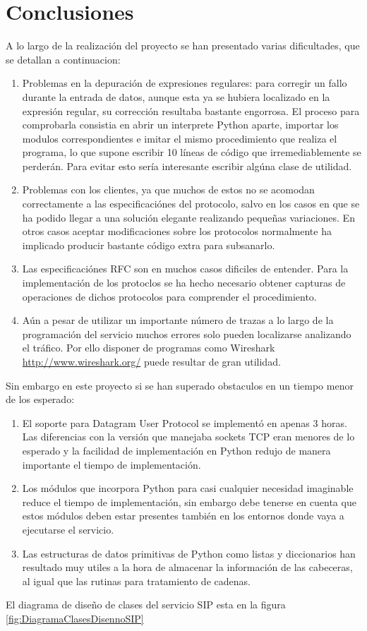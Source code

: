 \documentclass[a4paper,spanish,12pt]{book}
\begin{document}
\section{Conclusiones}
A lo largo de la realización del proyecto se han presentado varias dificultades, que se detallan a continuacion:
\begin{enumerate}
	\item Problemas en la depuración de expresiones regulares: para corregir un fallo durante la entrada de datos, aunque esta ya se hubiera localizado en la expresión regular, su corrección resultaba bastante engorrosa. El proceso para comprobarla consistia en abrir un interprete Python aparte, importar los modulos correspondientes e imitar el mismo procedimiento que realiza el programa, lo que supone escribir 10 líneas de código que irremediablemente se perderán. Para evitar esto sería interesante escribir algúna clase de utilidad.
	\item Problemas con los clientes, ya que muchos de estos no se acomodan correctamente a las especificaciónes del protocolo, salvo en los casos en que se ha podido llegar a una solución elegante realizando pequeñas variaciones. En otros casos aceptar modificaciones sobre los protocolos normalmente ha implicado producir bastante código extra para subsanarlo.
	\item Las especificaciónes RFC son en muchos casos dificiles de entender. Para la implementación de los protoclos se ha hecho necesario obtener capturas de operaciones de dichos protocolos para comprender el procedimiento.
	\item Aún a pesar de utilizar un importante número de trazas a lo largo de la programación del servicio muchos errores solo pueden localizarse analizando el tráfico. Por ello disponer de programas como Wireshark \url{http://www.wireshark.org/} puede resultar de gran utilidad.
\end{enumerate}
Sin embargo en este proyecto si se han superado obstaculos en un tiempo menor de los esperado:
\begin{enumerate}
	\item El soporte para Datagram User Protocol se implementó en apenas 3 horas. Las diferencias con la versión que manejaba sockets TCP eran menores de lo esperado y la facilidad de implementación en Python redujo de manera importante el tiempo de implementación.
	\item Los módulos que incorpora Python para casi cualquier necesidad imaginable reduce el tiempo de implementación, sin embargo debe tenerse en cuenta que estos módulos deben estar presentes tambi\'en en los entornos donde vaya a ejecutarse el servicio.
	\item Las estructuras de datos primitivas de Python como listas y diccionarios han resultado muy utiles a la hora de almacenar la información de las cabeceras, al igual que las rutinas para tratamiento de cadenas.
\end{enumerate}
El diagrama de diseño de clases del servicio SIP esta en la figura \ref{fig:DiagramaClasesDisennoSIP}
\end{document}
